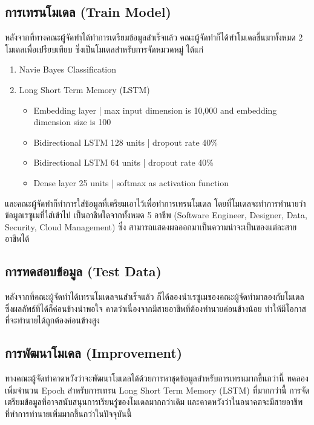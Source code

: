 \subsection{การเทรนโมเดล (Train Model)}
หลังจากที่ทางคณะผู้จัดทำได้ทำการเตรียมข้อมูลสำเร็จแล้ว คณะผู้จัดทำก็ได้ทำโมเดลขึ้นมาทั้งหมด 2 โมเดลเพื่อเปรียบเทียบ
ซึ่งเป็นโมเดลสำหรับการจัดหมวดหมู่ ได้แก่
\begin{enumerate}
    \item Navie Bayes Classification
    \item Long Short Term Memory (LSTM)
          \begin{itemize}
              \item Embedding layer              | max input dimension is 10,000 and embedding dimension size is 100
              \item Bidirectional LSTM 128 units | dropout rate 40\%
              \item Bidirectional LSTM 64 units  | dropout rate 40\%
              \item Dense layer 25 units         | softmax as activation function
          \end{itemize}
\end{enumerate}
\par และคณะผู้จัดทำก็ทำการใส่ข้อมูลที่เตรียมเอาไว้เพื่อทำการเทรนโมเดล โดยที่โมเดลจะทำการทำนายว่าข้อมูลเรซูเมที่ใส่เข้าไป
เป็นอาชีพใดจากทั้งหมด 5 อาชีพ (Software Engineer, Designer, Data, Security, Cloud Management) ซึ่ง
สามารถแสดงผลออกมาเป็นความน่าจะเป็นของแต่ละสายอาชีพได้

\subsection{การทดสอบข้อมูล (Test Data)}
หลังจากที่คณะผู้จัดทำได้เทรนโมเดลจนสำเร็จแล้ว ก็ได้ลองนำเรซูเมของคณะผู้จัดทำมาลองกับโมเดล ซึ่งผลลัพธ์ที่ได้ก็ค่อนข้างน่าพอใจ
คาดว่าเนื่องจากมีสายอาชีพที่ต้องทำนายค่อนข้างน้อย ทำให้มีโอกาสที่จะทำนายได้ถูกต้องค่อนข้างสูง

\subsection{การพัฒนาโมเดล (Improvement)}
ทางคณะผู้จัดทำคาดหวังว่าจะพัฒนาโมเดลได้ด้วยการหาชุดข้อมูลสำหรับการเทรนมากขึ้นกว่านี้ ทดลองเพิ่มจำนวน Epoch สำหรับการเทรน
Long Short Term Memory (LSTM) ที่มากกว่านี้ การจัดเตรียมข้อมูลที่อาจสนับสนุนการเรียนรู่ของโมเดลมากกว่าเดิม และคาดหวังว่าในอนาคตจะมีสายอาชีพที่ทำการทำนายเพิ่มมากขึ้นกว่าในปัจจุบันนี้

